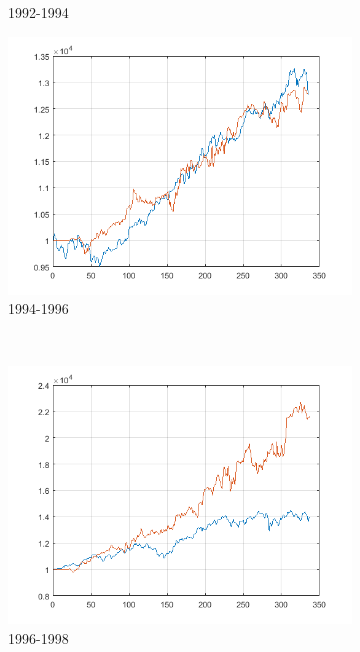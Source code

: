 \documentclass[11pt,a4,twosided,singlespacing,titlepagenumber=on]{scrreprt}
\numberwithin{equation}{chapter} %
\theoremstyle{remark}
\begin{document}
\begin{figure}[H]
\begin{subfigure}[t]{0.32\textwidth}
        \caption{1992-1994}
    \end{subfigure}
    \begin{subfigure}[t]{0.32\textwidth}
        \centering
        \includegraphics[width=1\textwidth]{res/backtest/3}
        \caption{1994-1996}
    \end{subfigure} \\
    \begin{subfigure}[t]{0.32\textwidth}
        \centering
        \includegraphics[width=1\textwidth]{res/backtest/4}
        \caption{1996-1998}
    \end{subfigure}
    \begin{subfigure}[t]{0.32\textwidth}
        \centering

\end{subfigure}
\end{figure}
\end{document}

